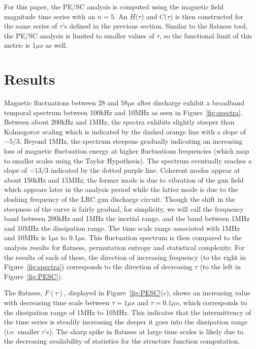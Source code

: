 \documentclass[aip,pop,amsmath,amssymb,preprint,superscriptaddress]{revtex4-1} %
\begin{document}
For this paper, the PE/SC analysis is computed using the magnetic field magnitude time series with an $n=5$. An $H(\tau$) and $C(\tau$) is then constructed for the same series of $\tau$'s defined in the previous section. Similar to the flatness tool, the PE/SC analysis is limited to smaller values of $\tau$, so the functional limit of this metric is $1\mu s$ as well.

\section{Results}

Magnetic fluctuations between $28$ and $58\mu$s after discharge exhibit a broadband temporal spectrum between 100kHz and 10MHz as seen in Figure~\ref{fig:spectra}. Between about 200kHz and 1MHz, the spectra exhibits slightly steeper than Kolmogorov scaling which is indicated by the dashed orange line with a slope of $-5/3$. Beyond 1MHz, the spectrum steepens gradually indicating an increasing loss of magnetic fluctuation energy at higher fluctuations frequencies (which map to smaller scales using the Taylor Hypothesis). The spectrum eventually reaches a slope of $-13/3$ indicated by the dotted purple line. Coherent modes appear at about 150kHz and 15MHz; the former mode is due to vibration of the gun field which appears later in the analysis period while the latter mode is due to the sloshing frequency of the LRC gun discharge circuit. Though the shift in the steepness of the curve is fairly gradual, for simplicity, we will call the frequency band between 200kHz and 1MHz the inertial range, and the band between 1MHz and 10MHz the dissipation range. The time scale range associated with 1MHz and 10MHz is 1$\mu$s to 0.1$\mu$s. This fluctuation spectrum is then compared to the analysis results for flatness, permutation entropy and statistical complexity. For the results of each of these, the direction of increasing frequency (to the right in Figure~\ref{fig:spectra}) corresponds to the direction of decreasing $\tau$ (to the left in Figure~\ref{fig:PESC}).

The flatness, $F(\tau)$, displayed in Figure~\ref{fig:PESC}(c), shows an increasing value with decreasing time scale between $\tau = 1\mu s$ and $\tau = 0.1\mu s$, which corresponds to the dissipation range of 1MHz to 10MHz. This indicates that the intermittency of the time series is steadily increasing the deeper it goes into the dissipation range (i.e. smaller $\tau$'s). The sharp spike in flatness at large time scales is likely due to the decreasing availability of statistics for the structure function computation.
\end{document}
